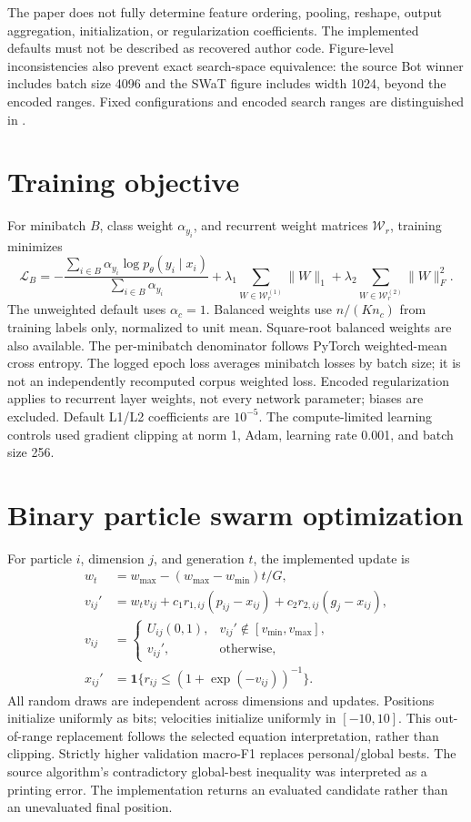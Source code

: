 \documentclass[11pt,a4paper]{report}
\begin{document}
The paper does not fully determine feature ordering, pooling, reshape, output aggregation, initialization, or regularization coefficients. The implemented defaults must not be described as recovered author code. Figure-level inconsistencies also prevent exact search-space equivalence: the source Bot winner includes batch size 4096 and the SWaT figure includes width 1024, beyond the encoded ranges. Fixed configurations and encoded search ranges are distinguished in .

\section{Training objective}
For minibatch $B$, class weight $\alpha_{y_i}$, and recurrent weight matrices $\mathcal W_r$, training minimizes
\begin{equation}
 \mathcal L_B=-\frac{\sum_{i\in B}\alpha_{y_i}\log p_\theta(y_i\mid x_i)}{\sum_{i\in B}\alpha_{y_i}}
 +\lambda_1\!\sum_{W\in\mathcal W_r^{(1)}}\!\|W\|_1
 +\lambda_2\!\sum_{W\in\mathcal W_r^{(2)}}\!\|W\|_F^2.
\end{equation}
The unweighted default uses $\alpha_c=1$. Balanced weights use $n/(K n_c)$ from training labels only, normalized to unit mean. Square-root balanced weights are also available. The per-minibatch denominator follows PyTorch weighted-mean cross entropy. The logged epoch loss averages minibatch losses by batch size; it is not an independently recomputed corpus weighted loss. Encoded regularization applies to recurrent layer weights, not every network parameter; biases are excluded. Default L1/L2 coefficients are $10^{-5}$. The compute-limited learning controls used gradient clipping at norm 1, Adam, learning rate 0.001, and batch size 256.

\section{Binary particle swarm optimization}
For particle $i$, dimension $j$, and generation $t$, the implemented update is
\begin{align}
 w_t&=w_{\max}-(w_{\max}-w_{\min})t/G,\\
 v_{ij}'&=w_tv_{ij}+c_1r_{1,ij}(p_{ij}-x_{ij})+c_2r_{2,ij}(g_j-x_{ij}),\\
 v_{ij}&=\begin{cases}U_{ij}(0,1),&v_{ij}'\notin[v_{\min},v_{\max}],\\v_{ij}',&\text{otherwise},\end{cases}\\
 x_{ij}'&=\mathbf{1}\{r_{ij}\leq (1+\exp(-v_{ij}))^{-1}\}.
\end{align}
All random draws are independent across dimensions and updates. Positions initialize uniformly as bits; velocities initialize uniformly in $[-10,10]$. This out-of-range replacement follows the selected equation interpretation, rather than clipping. Strictly higher validation macro-F1 replaces personal/global bests. The source algorithm's contradictory global-best inequality was interpreted as a printing error. The implementation returns an evaluated candidate rather than an unevaluated final position.
\end{document}
